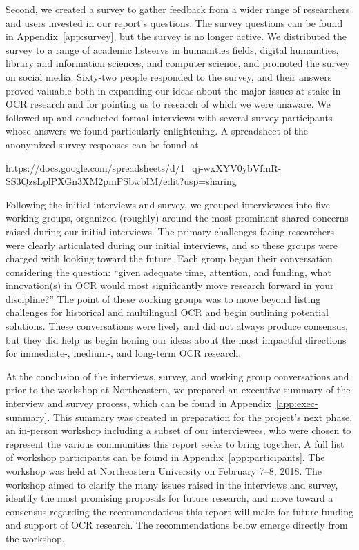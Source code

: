 \documentclass[twoside,11pt]{report}
\begin{document}
Second, we created a survey to gather feedback from a wider range of researchers and users invested in our report's questions. The survey questions can be found in Appendix~\ref{app:survey}, but the survey is no longer active. We distributed the survey to a range of academic listservs in humanities fields, digital humanities, library and information sciences, and computer science, and promoted  the survey on social media. Sixty-two people responded to the survey, and their answers proved valuable both in expanding our ideas about the major issues at stake in OCR research and for pointing us to research of which we were unaware. We followed up and conducted formal interviews with several survey participants whose answers we found particularly enlightening. A spreadsheet of the anonymized survey responses can be found at

\url{https://docs.google.com/spreadsheets/d/1_qj-wxXYV0ybVfmR-SS3QzsLplPXGn3XM2pmPSbwbIM/edit?usp=sharing}

Following the initial interviews and survey, we grouped interviewees into five working groups, organized (roughly) around the most prominent shared concerns raised during our initial interviews. The primary challenges facing researchers were clearly articulated during our initial interviews, and so these groups were charged with looking toward the future. Each group began their conversation considering the question: ``given adequate time, attention, and funding, what innovation(s) in OCR would most significantly move research forward in your discipline?''  The point of these working groups was to move beyond listing challenges for historical and multilingual OCR and begin outlining potential solutions. These conversations were lively and did not always produce consensus, but they did help us begin honing our ideas about the most impactful directions for immediate-, medium-, and long-term OCR research.

At the conclusion of the interviews, survey, and working group conversations and prior to the workshop at Northeastern, we prepared an executive summary of the interview and survey process, which can be found in Appendix~\ref{app:exec-summary}. This summary was created in preparation for the project's next phase, an in-person workshop including a subset of our interviewees, who were chosen to represent the various communities this report seeks to bring together. A full list of workshop participants can be found in Appendix~\ref{app:participants}.  The workshop was held at Northeastern University on February 7--8, 2018. The workshop aimed to clarify the many issues raised in the interviews and survey, identify the most promising proposals for future research, and move toward a consensus regarding the recommendations this report will make for future funding and support of OCR research. The recommendations below emerge directly from the workshop.
\end{document}
